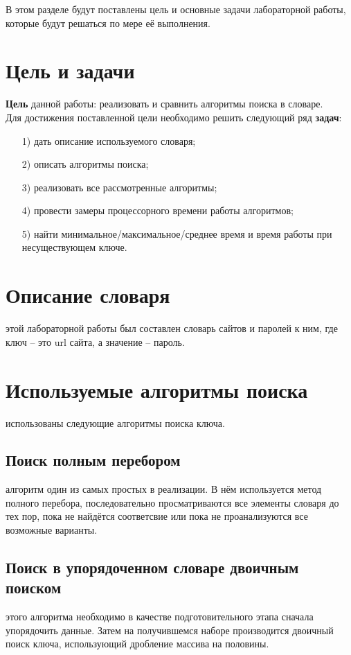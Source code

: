 В этом разделе будут поставлены цель и основные задачи лабораторной работы, которые будут решаться по мере её выполнения.

\section{Цель и задачи}
\qquad\textbf{Цель} данной работы: реализовать и сравнить алгоритмы поиска в словаре.\\

Для достижения поставленной цели необходимо решить следующий ряд \textbf{задач}:
\begin{enumerate}
	\item[1)] дать описание используемого словаря;
	\item[2)] описать алгоритмы поиска;
	\item[3)] реализовать все рассмотренные алгоритмы;
	\item[4)] провести замеры процессорного времени работы алгоритмов;
	\item[5)] найти минимальное/максимальное/среднее время и время работы при несуществующем ключе.
\end{enumerate}

\section{Описание словаря}
 этой лабораторной работы был составлен словарь сайтов и паролей к ним, где ключ -- это url сайта, а значение -- пароль.

\section{Используемые алгоритмы поиска}
 использованы следующие алгоритмы поиска ключа.

\subsection{Поиск полным перебором}
 алгоритм один из самых простых в реализации. В нём используется метод полного перебора, последовательно просматриваются все элементы словаря до тех пор, пока не найдётся соответсвие или пока не проанализуются все возможные варианты. \cite{Kormen}

\subsection{Поиск в упорядоченном словаре двоичным поиском}
 этого алгоритма необходимо в качестве подготовительного этапа сначала упорядочить данные. Затем на получившемся наборе производится двоичный поиск ключа, использующий дробление массива на половины. \\

